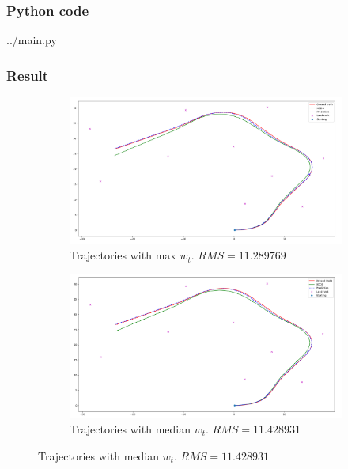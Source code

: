 \documentclass{article}
\begin{document}
\subsubsection{Python code}

{../main.py}

\subsubsection{Result} 
\begin{figure}[h!]
\centering
\begin{subfigure}[b]{0.7\linewidth}
	\includegraphics[width=\textwidth]{../max.png}
	\caption{Trajectories with max $w_t$. $RMS = 11.289769$}\label{fig:image-1}
\end{subfigure}
\begin{subfigure}[b]{0.7\linewidth}
	\includegraphics[width=\textwidth]{../median.png}
	\caption{Trajectories with median $w_t$. $RMS = 11.428931$}\label{fig:image-2}
\end{subfigure}

\end{figure}
\end{document}
